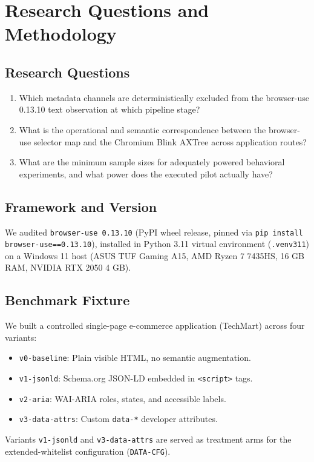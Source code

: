 \documentclass[conference]{IEEEtran}
\begin{document}
\section{Research Questions and Methodology}
\label{sec:rqs}

\subsection{Research Questions}
\begin{enumerate}
    \item[\textbf{RQ1}] Which metadata channels are deterministically excluded from the browser-use 0.13.10 text observation at which pipeline stage?
    \item[\textbf{RQ2}] What is the operational and semantic correspondence between the browser-use selector map and the Chromium Blink AXTree across application routes?
    \item[\textbf{RQ3}] What are the minimum sample sizes for adequately powered behavioral experiments, and what power does the executed pilot actually have?
\end{enumerate}

\subsection{Framework and Version}
We audited \texttt{browser-use 0.13.10} (PyPI wheel release, pinned via \texttt{pip install browser-use==0.13.10}), installed in Python 3.11 virtual environment (\texttt{.venv311}) on a Windows 11 host (ASUS TUF Gaming A15, AMD Ryzen 7 7435HS, 16 GB RAM, NVIDIA RTX 2050 4 GB).

\subsection{Benchmark Fixture}
We built a controlled single-page e-commerce application (TechMart) across four variants:
\begin{itemize}
    \item \texttt{v0-baseline}: Plain visible HTML, no semantic augmentation.
    \item \texttt{v1-jsonld}: Schema.org JSON-LD embedded in \texttt{<script>} tags.
    \item \texttt{v2-aria}: WAI-ARIA roles, states, and accessible labels.
    \item \texttt{v3-data-attrs}: Custom \texttt{data-*} developer attributes.
\end{itemize}
Variants \texttt{v1-jsonld} and \texttt{v3-data-attrs} are served as treatment arms for the extended-whitelist configuration (\texttt{DATA-CFG}).
\end{document}
